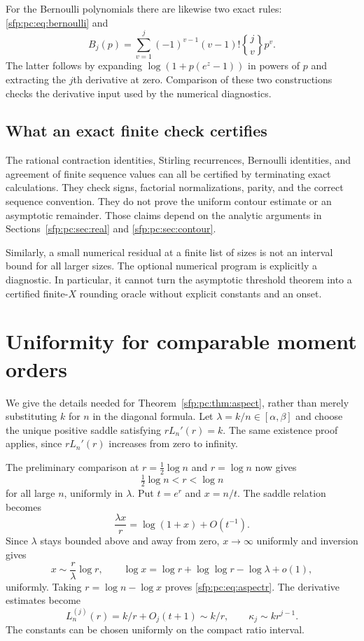 \documentclass[11pt,letterpaper]{article}
\numberwithin{equation}{section}
\theoremstyle{definition}\newtheorem{definition}[theorem]{Definition}
\theoremstyle{remark}\newtheorem{remark}[theorem]{Remark}
\newcommand{\stwo}[2]{\genfrac{\{} {\}}{0pt}{}{#1}{#2}}
\begin{document}
For the Bernoulli polynomials there are likewise two exact rules:
\eqref{sfp:pc:eq:bernoulli} and
\begin{equation}\label{sfp:pc:eq:BernoulliStirling}
 B_j(p)=\sum_{v=1}^j(-1)^{v-1}(v-1)!\stwo jv p^v.
\end{equation}
The latter follows by expanding
$\log(1+p(e^z-1))$ in powers of $p$ and extracting the $j$th
derivative at zero. Comparison of these two constructions checks
the derivative input used by the numerical diagnostics.

\subsection{What an exact finite check certifies}

The rational contraction identities, Stirling recurrences,
Bernoulli identities, and agreement of finite sequence values can
all be certified by terminating exact calculations. They check
signs, factorial normalizations, parity, and the correct sequence
convention. They do not prove the uniform contour estimate or an
asymptotic remainder. Those claims depend on the analytic arguments
in Sections~\ref{sfp:pc:sec:real} and \ref{sfp:pc:sec:contour}.

Similarly, a small numerical residual at a finite list of sizes is
not an interval bound for all larger sizes. The optional numerical
program is explicitly a diagnostic. In particular, it cannot turn
the asymptotic threshold theorem into a certified finite-$X$
rounding oracle without explicit constants and an onset.

\section{Uniformity for comparable moment orders}\label{sfp:pc:sec:aspect}

We give the details needed for Theorem~\ref{sfp:pc:thm:aspect}, rather than
merely substituting $k$ for $n$ in the diagonal formula. Let
$\lambda=k/n\in[\alpha,\beta]$ and choose the unique positive
saddle satisfying $rL_n'(r)=k$. The same existence proof applies,
since $rL_n'(r)$ increases from zero to infinity.

The preliminary comparison at $r=\tfrac12\log n$ and
$r=\log n$ now gives
\[
 \tfrac12\log n<r<\log n
\]
for all large $n$, uniformly in $\lambda$. Put $t=e^r$ and
$x=n/t$. The saddle relation becomes
\begin{equation}\label{sfp:pc:eq:aspectx}
 \frac{\lambda x}{r}=\log(1+x)+O(t^{-1}).
\end{equation}
Since $\lambda$ stays bounded above and away from zero,
$x\to\infty$ uniformly and inversion gives
\[
 x\sim\frac r\lambda\log r,
 \qquad \log x=\log r+\log\log r-\log\lambda+o(1),
\]
uniformly. Taking $r=\log n-\log x$ proves
\eqref{sfp:pc:eq:aspectr}. The derivative estimates become
\[
 L_n^{(j)}(r)=k/r+O_j(t+1)\sim k/r,
 \qquad \kappa_j\sim kr^{j-1}.
\]
The constants can be chosen uniformly on the compact ratio interval.
\end{document}
